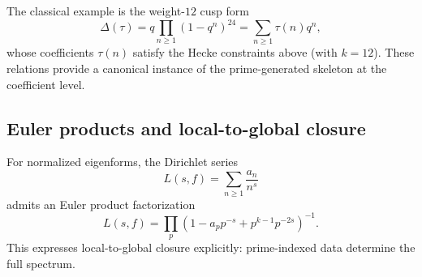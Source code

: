 The classical example is the weight-$12$ cusp form
\begin{equation}
\Delta(\tau)=q\prod_{n\ge 1}(1-q^n)^{24}=\sum_{n\ge 1}\tau(n)q^n,
\end{equation}
whose coefficients $\tau(n)$ satisfy the Hecke constraints above (with $k=12$). These relations provide a canonical instance of the prime-generated skeleton at the coefficient level.

\subsection{Euler products and local-to-global closure}
\label{sec:euler_product}

For normalized eigenforms, the Dirichlet series
\begin{equation}
L(s,f)=\sum_{n\ge 1}\frac{a_n}{n^s}
\end{equation}
admits an Euler product factorization
\begin{equation}
L(s,f)=\prod_{p}\left(1-a_p p^{-s}+p^{k-1}p^{-2s}\right)^{-1}.
\end{equation}
This expresses local-to-global closure explicitly: prime-indexed data determine the full spectrum.


